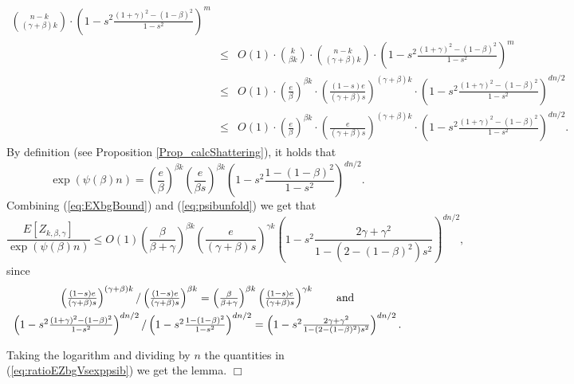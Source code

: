\documentclass[a4paper,10pt]{article}
\makeatletter
\newenvironment{proof}{\noindent{\bf Proof\@:}}{\hfill $\Box$\\}
\makeatother
\begin{document}
\begin{proof}
\begin{eqnarray}
{n-k \choose (\gamma+\beta)k} \cdot \left( 1-s^2\frac{(1+\gamma)^2- (1-\beta)^2 }
{1-s^2}\right)^m \nonumber\\ 
&\leq & \displaystyle O(1)\cdot {k \choose \beta k}\cdot 
{n-k \choose (\gamma+\beta)k} \cdot \left( 1-s^2\frac{(1+\gamma)^2- (1-\beta)^2 }
{1-s^2}\right)^m \nonumber \\ 
&\leq & \displaystyle O(1)\cdot \left(\frac{e}{\beta }\right)^{\beta k} \cdot 
\left( \frac{(1-s)e}{(\gamma+\beta)s} \right)^{(\gamma+\beta)k}\cdot \left( 1-s^2\frac{(1+\gamma)^2- (1-\beta)^2 }
{1-s^2}\right)^{dn/2}\nonumber \\
&\leq & \displaystyle O(1)\cdot \left(\frac{e}{\beta }\right)^{\beta k} \cdot 
\left( \frac{e}{(\gamma+\beta)s} \right)^{(\gamma+\beta)k}\cdot \left( 1-s^2\frac{(1+\gamma)^2- (1-\beta)^2 }{1-s^2}\right)^{dn/2}.\label{eq:EXbgBound}
\end{eqnarray}
By definition (see  Proposition \ref{Prop_calcShattering}), 
it holds that 
\begin{equation}\label{eq:psibunfold}
\exp\left(\psi(\beta)n\right)=\left(\frac{e}{\beta }\right)^{\beta k}
\left( \frac{e}{\beta s} \right)^{\beta k}
\left( 1-s^2\frac{1- (1-\beta)^2 }{1-s^2}\right)^{dn/2}.
\end{equation}
Combining (\ref{eq:EXbgBound}) and (\ref{eq:psibunfold}) we get that
\begin{equation}\label{eq:ratioEZbgVsexppsib}
\frac{E[Z_{k,\beta,\gamma}]}{\exp\left(\psi(\beta) n\right)}\leq
O(1)\left( \frac{\beta}{\beta+\gamma} \right)^{\beta k}
\left( \frac{e}{(\gamma+\beta)s} \right)^{\gamma k}
\left( 1-s^2\frac{2\gamma+\gamma^2}{1-(2-(1-\beta)^2)s^2}\right)^{dn/2},
\end{equation}
since 
\begin{displaymath}
\begin{array}{c}
\left( \frac{(1-s)e}{(\gamma+\beta)s} \right)^{(\gamma+\beta)k}/
\left( \frac{(1-s)e}{(\gamma+\beta)s} \right)^{\beta k}=
\left( \frac{\beta}{\beta+\gamma} \right)^{\beta k}
\left( \frac{(1-s)e}{(\gamma+\beta)s} \right)^{\gamma k} \qquad \textrm{and}
\\ \vspace{-.3cm}\\
\left( 1-s^2\frac{(1+\gamma)^2- (1-\beta)^2 }{1-s^2}\right)^{dn/2}/
\left( 1-s^2\frac{1- (1-\beta)^2 }{1-s^2}\right)^{dn/2}=
\left( 1-s^2\frac{2\gamma+\gamma^2}{1-(2-(1-\beta)^2)s^2}\right)^{dn/2}.
\end{array}
\end{displaymath}

\noindent
Taking the logarithm and dividing by $n$ the quantities in 
(\ref{eq:ratioEZbgVsexppsib}) we get the lemma.
\end{proof}
\end{document}
